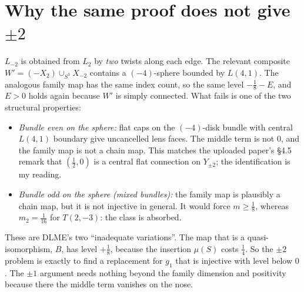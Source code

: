 \documentclass[10pt]{amsart}
\begin{document}
\section{Why the same proof does not give $\pm2$}

$L_{-2}$ is obtained from $L_2$ by \emph{two} twists along each edge. The relevant
composite $W'=(-X_2)\cup_{S^3}X_{-2}$ contains a $(-4)$-sphere bounded by $L(4,1)$. The
analogous family map has the same index count, so the same level $-\frac18-E$, and $E>0$
holds again because $W'$ is simply connected. What fails is one of the two
structural properties:
\begin{itemize}
\item \emph{Bundle even on the sphere:} flat caps on the $(-4)$-disk bundle with central
$L(4,1)$ boundary give uncancelled lens faces. The middle term is not $0$, and the
family map is not a chain map. This matches the uploaded paper's \S4.5 remark that $(\frac12,0)$
is a central flat connection on $Y_{\pm2}$; the identification is my reading.
\item \emph{Bundle odd on the sphere (mixed bundles):} the family map is plausibly a chain
map, but it is not injective in general. It would force $m\ge\frac18$, whereas
$m_2=\frac1{16}$ for $T(2,-3)$: the class is absorbed.
\end{itemize}
These are DLME's two ``inadequate variations''. The map that is a quasi-isomorphism,
$B$, has level $+\frac18$, because the insertion $\mu(S)$ costs $\frac14$. So the
$\pm2$ problem is exactly to find a replacement for $g_1$ that is injective with
level below $0$. The $\pm1$ argument needs nothing beyond the family dimension and
positivity because there the middle term vanishes on the nose.
\end{document}
